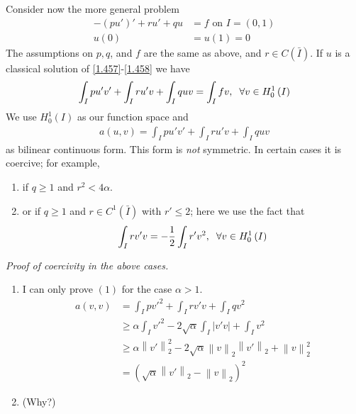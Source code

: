 \documentclass[a4paper,oneside]{article}
\numberwithin{equation}{section}
\begin{document}
Consider now the more general problem
\begin{align}
\label{1.457}
 - \left( {pu'} \right)' + ru' + qu &= f\mbox{ on } I = \left( {0,1} \right)\\
u\left( 0 \right) &= u\left( 1 \right) = 0 \label{1.458}
\end{align}
The assumptions on $p,q$, and $f$ are the same as above, and $r\in C\left(\bar I\right)$. If $u$ is a classical solution of \eqref{1.457}-\eqref{1.458} we have
\begin{align}
\int_I {pu'v'}  + \int_I {ru'v}  + \int_I {quv}  = \int_I {fv} ,\hspace{0.2cm}\forall v \in H_0^1\left( I \right)
\end{align}
We use $H_0^1\left(I\right)$ as our function space and 
\begin{align}
a\left( {u,v} \right) = \int_I {pu'v'}  + \int_I {ru'v}  + \int_I {quv} 
\end{align}
as bilinear continuous form. This form is \textit{not} symmetric. In certain cases it is coercive; for example,
\begin{enumerate}
\item if $q\ge 1$ and $r^2<4\alpha$.
\item or if $q\ge 1$ and $r\in C^1\left(\bar I\right)$ with $r'\le 2$; here we use the fact that
\begin{align}
\label{1.461}
\int_I {rv'v}  =  - \frac{1}{2}\int_I {r'{v^2}} ,\hspace{0.2cm}\forall v \in H_0^1\left( I \right)
\end{align}
\end{enumerate}
\textit{Proof of coercivity in the above cases.} 
\begin{enumerate}
\item I can only prove $\left(1\right)$ for the case $\alpha >1$.
\begin{align}
a\left( {v,v} \right) &= \int_I {pv{'^2}}  + \int_I {rv'v}  + \int_I {q{v^2}} \\
& \ge \alpha \int_I {v{'^2}}  - 2\sqrt \alpha  \int_I {\left| {v'v} \right|}  + \int_I {{v^2}} \\
 &\ge \alpha \left\| {v'} \right\|_2^2 - 2\sqrt \alpha  {\left\| v \right\|_2}{\left\| {v'} \right\|_2} + \left\| v \right\|_2^2\\
& = {\left( {\sqrt \alpha  {{\left\| {v'} \right\|}_2} - {{\left\| v \right\|}_2}} \right)^2}
\end{align}
\item  (Why?)
\end{enumerate}
\end{document}
